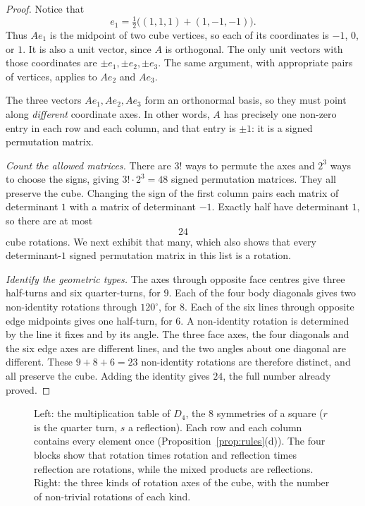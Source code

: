 \begin{proof}
Notice that
\[
e_1=\tfrac12\bigl((1,1,1)+(1,-1,-1)\bigr).
\]
Thus $Ae_1$ is the midpoint of two cube vertices,
so each of its coordinates is $-1$, $0$, or $1$.
It is also a unit vector, since $A$ is orthogonal.
The only unit vectors with those coordinates are
$\pm e_1,\pm e_2,\pm e_3$. The same argument,
with appropriate pairs of vertices, applies to
$Ae_2$ and $Ae_3$.

The three vectors $Ae_1,Ae_2,Ae_3$ form an
orthonormal basis, so they must point along
\emph{different} coordinate axes. In other words,
$A$ has precisely one non-zero entry in each
row and each column, and that entry is $\pm1$:
it is a signed permutation matrix.

\emph{Count the allowed matrices.}
There are $3!$ ways to permute the axes and
$2^3$ ways to choose the signs, giving
$3!\cdot2^3=48$ signed permutation matrices.
They all preserve the cube. Changing the sign
of the first column pairs each matrix of
determinant $1$ with a matrix of determinant
$-1$. Exactly half have determinant $1$, so there are at most
\[
\boxed{24}
\]
cube rotations. We next exhibit that many, which also shows that every determinant-$1$ signed permutation matrix in this list is a rotation.

\emph{Identify the geometric types.}
The axes through opposite face centres give
three half-turns and six quarter-turns, for $9$.
Each of the four body diagonals gives two
non-identity rotations through $120^\circ$,
for $8$. Each of the six lines through
opposite edge midpoints gives one half-turn,
for $6$. A non-identity rotation is determined by the line it fixes and by its angle. The three face axes, the four diagonals and the six edge axes are different lines, and the two angles about one diagonal are different. These $9+8+6=23$ non-identity
rotations are therefore distinct, and all preserve
the cube. Adding the identity gives $24$,
the full number already proved.
\end{proof}

\begin{figure}[ht]
\centering
{}
\caption{Left: the multiplication table of $D_4$, the $8$ symmetries of a square ($r$ is the quarter turn, $s$ a reflection). Each row and each column contains every element once (Proposition~\ref{prop:rules}(d)). The four blocks show that rotation times rotation and reflection times reflection are rotations, while the mixed products are reflections. Right: the three kinds of rotation axes of the cube, with the number of non-trivial rotations of each kind.}
\label{fig:symmetries}
\end{figure}

